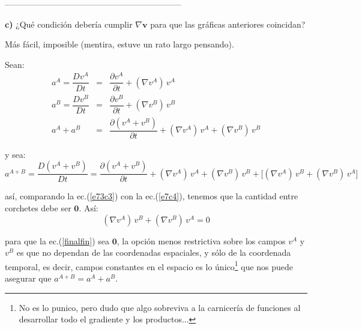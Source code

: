 \documentclass[10pt,a4paper]{article}
\theoremstyle{definition}
\begin{document}
---------------------------------------------------------------
\vspace{1cm}

\textbf{c)} ¿Qué condición debería cumplir $\nabla \mathbf{v}$ para que las gráficas anteriores coincidan?

Más fácil, imposible (mentira, estuve un rato largo pensando).

Sean:
\begin{eqnarray}
a^A = \dfrac{Dv^A}{Dt} & = & \dfrac{\partial v^A}{\partial t} + (\nabla v^A) \, v^A  \nonumber \\
a^B = \dfrac{Dv^B}{Dt} & = & \dfrac{\partial v^B}{\partial t} + (\nabla v^B) \, v^B  \nonumber \\
a^A + a^B & = & \dfrac{\partial (v^A + v^B)}{\partial t} + (\nabla v^A) \, v^A + (\nabla v^B) \, v^B \label{e73c3}
\end{eqnarray}

y sea:
\begin{equation}
a^{A + B}  = \dfrac{D(v^A + v^B)}{Dt} = \dfrac{\partial (v^A + v^B)}{\partial t} + (\nabla v^A) \, v^A + (\nabla v^B) \, v^B + \Bigg[ (\nabla v^A) \, v^B + (\nabla v^B) \, v^A \Bigg]\label{e7c4}
\end{equation}

\noindent así, comparando la ec.(\ref{e73c3}) con la ec.(\ref{e7c4}), tenemos que la cantidad entre corchetes debe ser $\mathbf{0}$. Así:
\begin{equation}
 (\nabla v^A) \, v^B + (\nabla v^B) \, v^A = 0 \label{finalfin}
\end{equation}

para que la ec.(\ref{finalfin}) sea $\mathbf{0}$, la opción menos restrictiva sobre los campos $v^A$ y $v^B$ es que no dependan de las coordenadas espaciales, y sólo de la coordenada temporal, es decir, campos constantes en el espacio es lo único\footnote{No es lo punico, pero dudo que algo sobreviva a la carnicería de funciones al desarrollar todo el gradiente y los productos...} que nos puede asegurar que $a^{A+B} = a^A + a^B$.
\end{document}
